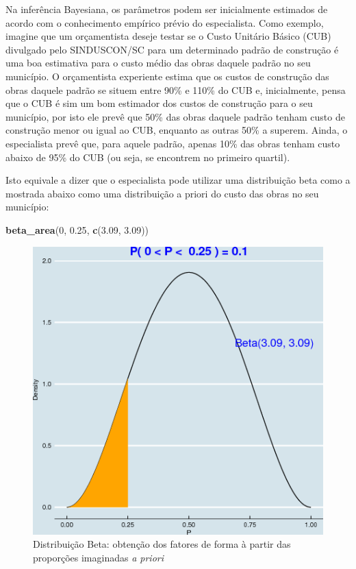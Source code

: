 \documentclass[a4paper]{article}
\newenvironment{Shaded}{\begin{snugshade}}{\end{snugshade}}
\newcommand{\KeywordTok}[1]{\textcolor[rgb]{0.13,0.29,0.53}{\textbf{#1}}}
\newcommand{\DecValTok}[1]{\textcolor[rgb]{0.00,0.00,0.81}{#1}}
\newcommand{\FloatTok}[1]{\textcolor[rgb]{0.00,0.00,0.81}{#1}}
\newcommand{\NormalTok}[1]{#1}
\begin{document}
Na inferência Bayesiana, os parâmetros podem ser inicialmente estimados
de acordo com o conhecimento empírico prévio do especialista. Como
exemplo, imagine que um orçamentista deseje testar se o Custo Unitário
Básico (CUB) divulgado pelo SINDUSCON/SC para um determinado padrão de
construção é uma boa estimativa para o custo médio das obras daquele
padrão no seu município. O orçamentista experiente estima que os custos
de construção das obras daquele padrão se situem entre 90\% e 110\% do
CUB e, inicialmente, pensa que o CUB é sim um bom estimador dos custos
de construção para o seu município, por isto ele prevê que 50\% das
obras daquele padrão tenham custo de construção menor ou igual ao CUB,
enquanto as outras 50\% a superem. Ainda, o especialista prevê que, para
aquele padrão, apenas 10\% das obras tenham custo abaixo de 95\% do CUB
(ou seja, se encontrem no primeiro quartil).

Isto equivale a dizer que o especialista pode utilizar uma distribuição
beta como a mostrada abaixo como uma distribuição a priori do custo das
obras no seu município:

\begin{Shaded}
\begin{Highlighting}[]
\KeywordTok{beta_area}\NormalTok{(}\DecValTok{0}\NormalTok{, }\FloatTok{0.25}\NormalTok{, }\KeywordTok{c}\NormalTok{(}\FloatTok{3.09}\NormalTok{, }\FloatTok{3.09}\NormalTok{))}
\end{Highlighting}
\end{Shaded}

\begin{figure}[H]

{\centering \includegraphics[width=0.7\linewidth]{images/beta_area-1} 

}

\caption{Distribuição Beta: obtenção dos fatores de forma à partir das proporções imaginadas \emph{a priori}}\label{fig:beta_area}
\end{figure}
\end{document}
